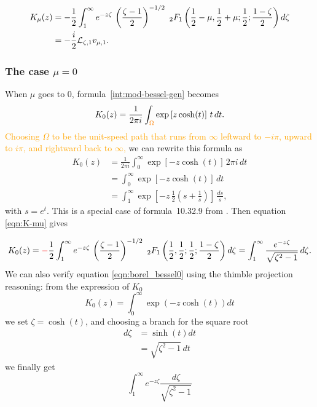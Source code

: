 \documentclass{article}
\newcommand{\laplace}{\mathcal{L}}
\theoremstyle{definition}
\theoremstyle{plain}
\newenvironment{verify}{\color{ForestGreen}}{\color{black}}
\begin{document}
\begin{align}
    K_{\mu}(z)& \label{eqn:K-mu}=-\frac{1}{2}\int_1^\infty e^{-z\zeta} \, \left(\frac{\zeta-1}{2}\right)^{-1/2} \,\, {}_2F_1\left(\frac{1}{2}-\mu, \frac{1}{2}+\mu;\frac{1}{2};\frac{1-\zeta}{2}\right)  d\zeta\\
    &  \notag=-\frac{i}{2}\laplace_{\zeta,1} v_{\mu,1} . 
\end{align}
\subsubsection{The case $\mu=0$}
When $\mu$ goes to $0$, formula~\eqref{int:mod-bessel-gen} becomes
\[ K_0(z) = \frac{1}{2\pi i} \int_ {\textcolor{orange}{\Omega}} \exp\left[z \cosh(t)\right]\,t\,dt. \]
\textcolor{orange}{Choosing $\Omega$ to be the unit-speed path that runs from $\infty$ leftward to $-i\pi$, upward to $i\pi$, and rightward back to $\infty$,} we can rewrite this formula as
\begin{align*}
K_0(z) & = \frac{1}{2\pi i} \int_0^\infty \exp\left[-z \cosh(t)\right]\,2\pi i\,dt \\
& = \int_0^\infty \exp\left[-z \cosh(t)\right]\,dt \\
& = \int_1^\infty \exp\left[-z\,\tfrac{1}{2}\left(s + \tfrac{1}{s}\right)\right]\,\frac{ds}{s},
\end{align*}
with $s = e^t$. This is a special case of formula~10.32.9 from \cite{dlmf}. Then equation \eqref{eqn:K-mu} gives

\begin{equation}\label{eqn:borel_bessel0}
    K_0(z)=\textcolor{red}{-}\frac{1}{2}\int_1^\infty e^{-z\zeta} \, \left(\frac{\zeta-1}{2}\right)^{-1/2} \,\, {}_2F_1\left(\frac{1}{2}, \frac{1}{2};\frac{1}{2};\frac{1-\zeta}{2}\right)  d\zeta =  \int_1^\infty \frac{e^{-z\zeta}}{\sqrt{\zeta^2-1}} \, d\zeta .
\end{equation}
\begin{verify}
    We can also verify equation \eqref{eqn:borel_bessel0} using the thimble projection reasoning: from the expression of $K_0$ 
    \begin{equation}
        K_0(z)=\int_0^{\infty} \exp(-z\cosh(t)) dt
    \end{equation}
    we set $\zeta=\cosh(t)$, and choosing a branch for the square root
    \begin{align*}
        d\zeta & = \sinh(t) dt\\
        & =  \sqrt{\zeta^2-1} \, dt
    \end{align*}
    we finally get 
    \[\int_1^{\infty} e^{-z\zeta} \frac{d\zeta}{\sqrt{\zeta^2-1}}\]
\end{verify}
\end{document}
